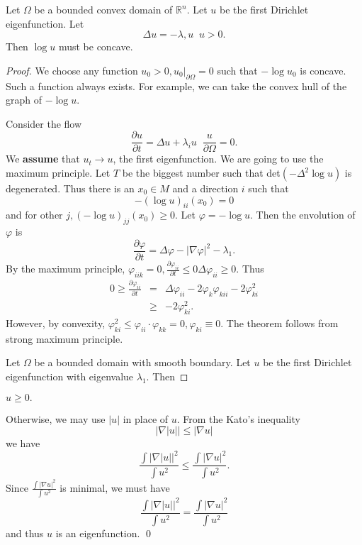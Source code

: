 \begin{theorem} Let $ \Omega $ be a bounded convex domain of $ \mathbb{R}^n$. Let $u$ be the first Dirichlet eigenfunction. Let 
%
\[ \Delta u = - \lambda , u  \;\; u > 0 .\]
%
Then $ \log u$ must be concave.

\end{theorem}
\begin{proof} We choose any function $ u_0 > 0 , u _0 |_{\partial \Omega} = 0 $ such that $ - 
\log u_0 $ is concave. Such a function always exists. For example, we can take the convex hull of the graph of $ - \log u$.

Consider the flow
%
\[ \frac{\partial u}{\partial t}  = \Delta u + \lambda _i u \;\; \frac{u}{\partial \Omega} = 0 .\]
%
We {\bf assume} that $ u_t \rightarrow u$, the first eigenfunction. We are going to use the maximum principle. Let $T$ be the biggest number such that det$(- \Delta ^2 \log u)$ is degenerated. Thus there is an $ x_0 \in M $ and a direction $i$ such that 
%
\[ - ( \log u) _{ii} (x_0) = 0 \]
%
and for other $j, (- \log u) _{jj} (x_0) \geq 0 $. Let $ \varphi = - \log u $. Then the envolution of $ \varphi$ is 
%
\[ \frac{\partial \varphi}{\partial t}  = \Delta \varphi - |\nabla \varphi |^2 - \lambda _1 . \]
By the maximum principle, $ \varphi_{iik}  = 0 , \frac{\partial \varphi_{ii}}{\partial t} \leq 0 \Delta \varphi _{ii} \geq 0 $. Thus
%
\begin{eqnarray*} 0 \geq \frac{\partial \varphi_{ii}}{\partial t} & = &\Delta \varphi_{ii} -2  \varphi _k \varphi_{kii} - 2 \varphi ^2_{ki} \\
& \geq & - 2 \varphi_{ki}^2.\end{eqnarray*}
%
However, by convexity, $ \varphi_{ki}^2 \leq \varphi_{ii} \cdot \varphi_{kk}=0, \varphi_{ki}  \equiv 0 $. 
%
The theorem follows from strong maximum principle.

Let $ \Omega $ be a bounded domain with smooth boundary. Let $ u$ be the first Dirichlet eigenfunction with eigenvalue $ \lambda _1$. Then

\end{proof}

\begin{lemma} $ u \geq 0. $ 
\end{lemma}

 Otherwise, we may use $ |u| $ in place of $u$. From the Kato's inequality
%
\[|\nabla |u|| \leq |\nabla u| \]
%
we have 
\[ \frac{\int |\nabla |u| |^2}{\int u^2} \leq \frac{\int |\nabla u|^2}{\int u^2}. \]
%
Since $\frac{\int |\nabla u|^2}{\int u^2} $ is minimal, we must have 
\[ \frac{\int |\nabla |u| |^2}{\int u^2} = \frac{\int |\nabla u|^2}{\int u^2} \]
%
and thus $u$ is an eigenfunction.
\qed

